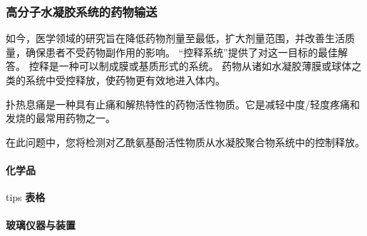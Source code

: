\subsubsection{高分子水凝胶系统的药物输送}\label{ux9ad8ux5206ux5b50ux6c34ux51ddux80f6ux7cfbux7edfux7684ux836fux7269ux8f93ux9001}

如今，医学领域的研究旨在降低药物剂量至最低，扩大剂量范围，并改善生活质量，确保患者不受药物副作用的影响。
``控释系统''提供了对这一目标的最佳解答。
控释是一种可以制成膜或基质形式的系统。
药物从诸如水凝胶薄膜或球体之类的系统中受控释放，使药物更有效地进入体内。

扑热息痛是一种具有止痛和解热特性的药物活性物质。它是减轻中度/轻度疼痛和发烧的最常用药物之一。

在此问题中，您将检测对乙酰氨基酚活性物质从水凝胶聚合物系统中的控制释放。

\paragraph{化学品}\label{ux5316ux5b66ux54c1}

tips \textbf{表格}

\paragraph{玻璃仪器与装置}\label{ux73bbux7483ux4eeaux5668ux4e0eux88c5ux7f6e}

